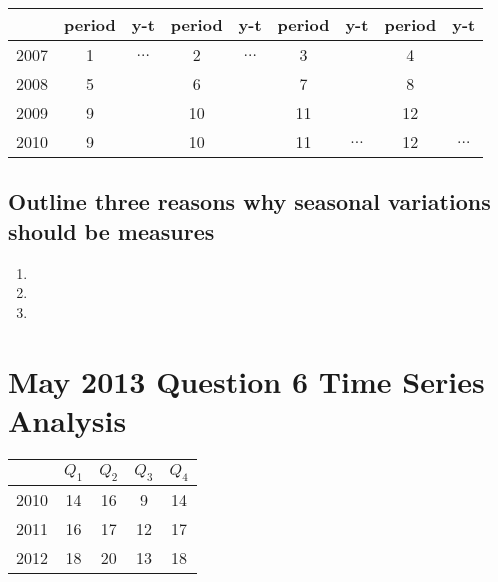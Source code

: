 \documentclass[a4paper,12pt]{article}
\begin{document}
\begin{center}
	\begin{tabular}{|c|c|c|c|c|c|c|c|c|}
		\hline  & period & \phantom{spa} y-t \phantom{spa} & period & \phantom{spa} y-t \phantom{spa} & period & \phantom{spa} y-t \phantom{spa} & period & \phantom{spa} y-t \phantom{spa} \\ 
		\hline 2007  & 1 & $\ldots$ & 2 & $\ldots$ & 3 &  & 4 &  \\ 
		\hline 2008 & 5 &  & 6 &  & 7 &  & 8 &  \\ 
		\hline 2009 & 9 &  & 10 &  & 11 &  & 12 &  \\
		\hline 2010 & 9 &  & 10 &  & 11 & $\ldots$ & 12 & $\ldots$  \\ 
		\hline 
	\end{tabular} 
\end{center}

\subsection*{Outline three reasons why seasonal variations should be measures}
\begin{enumerate}
	\item
	\item
	\item
\end{enumerate}
\newpage
\section*{May 2013 Question 6 Time Series Analysis}
\begin{center}
\begin{tabular}{|c|c|c|c|c|}
\hline  & $Q_1$ & $Q_2$ & $Q_3$ & $Q_4$ \\ 
\hline 2010 & 14 & 16 & 9 & 14 \\ 
\hline 2011 & 16 & 17 & 12 & 17 \\ 
\hline 2012 & 18 & 20 & 13 & 18 \\ 
\hline 
\end{tabular} 
\end{center}
\end{document}
